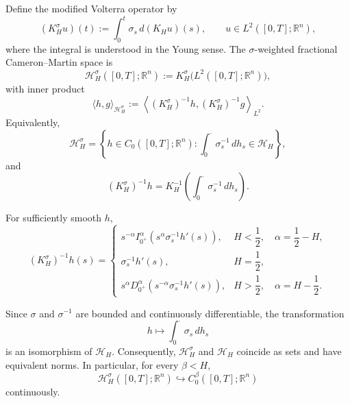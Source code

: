 \documentclass[preprint,12pt]{elsarticle}
\theoremstyle{definition}
\theoremstyle{plain}
\begin{document}
Define the modified Volterra operator by
\begin{equation}
\label{khsigma}
    (K_H^\sigma u)(t)
    :=
    \int_0^t \sigma_s\,d(K_Hu)(s),
    \qquad
    u\in L^2([0,T];\mathbb R^n),
\end{equation}
where the integral is understood in the Young sense. The
$\sigma$-weighted fractional Cameron--Martin space is
\begin{equation}
\label{eq:sigma_weighted_CM_space}
    \mathcal H_H^\sigma([0,T];\mathbb R^n)
    :=
    K_H^\sigma
    \bigl(L^2([0,T];\mathbb R^n)\bigr),
\end{equation}
with inner product
\begin{equation*}
    \langle h,g\rangle_{\mathcal H_H^\sigma}
    :=
    \left\langle
        (K_H^\sigma)^{-1}h,
        (K_H^\sigma)^{-1}g
    \right\rangle_{L^2}.
\end{equation*}
Equivalently,
\begin{equation*}
    \mathcal H_H^\sigma
    =
    \left\{
        h\in C_0([0,T];\mathbb R^n):
        \int_0^\cdot\sigma_s^{-1}\,dh_s
        \in\mathcal H_H
    \right\},
\end{equation*}
and
\begin{equation}
\label{eq:Ksigma_inverse}
    (K_H^\sigma)^{-1}h
    =
    K_H^{-1}
    \left(
        \int_0^\cdot\sigma_s^{-1}\,dh_s
    \right).
\end{equation}

For sufficiently smooth $h$,
\begin{equation}
\label{eq:Ksigma_inverse_explicit}
    (K_H^\sigma)^{-1}h(s)
    =
    \begin{cases}
        \displaystyle
        s^{-\alpha}I_{0^+}^\alpha
        \left(
            s^\alpha\sigma_s^{-1}h'(s)
        \right),
        & H<\dfrac12,
        \quad
        \alpha=\dfrac12-H,
        \\[2.5ex]
        \displaystyle
        \sigma_s^{-1}h'(s),
        & H=\dfrac12,
        \\[2.5ex]
        \displaystyle
        s^\alpha D_{0^+}^\alpha
        \left(
            s^{-\alpha}\sigma_s^{-1}h'(s)
        \right),
        & H>\dfrac12,
        \quad
        \alpha=H-\dfrac12.
    \end{cases}
\end{equation}

Since $\sigma$ and $\sigma^{-1}$ are bounded and continuously
differentiable, the transformation
\begin{equation*}
    h\longmapsto\int_0^\cdot\sigma_s\,dh_s
\end{equation*}
is an isomorphism of $\mathcal H_H$. Consequently,
$\mathcal H_H^\sigma$ and $\mathcal H_H$ coincide as sets and have
equivalent norms. In particular, for every $\beta<H$,
\begin{equation*}
    \mathcal H_H^\sigma([0,T];\mathbb R^n)
    \hookrightarrow
    C_0^\beta([0,T];\mathbb R^n)
\end{equation*}
continuously.
\end{document}
